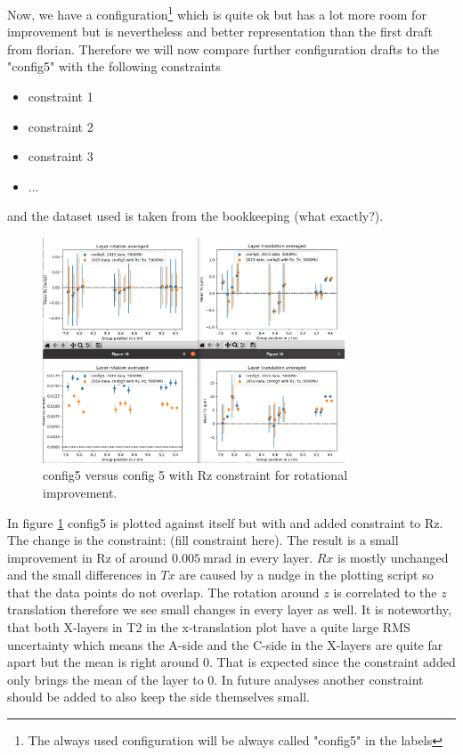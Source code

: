 
Now, we have a configuration\footnote{The always used configuration will be
always called "config5" in the labels} which is quite ok but has a lot more room for improvement but is nevertheless and better representation than the first draft from florian.
Therefore we will now compare further configuration drafts to the "config5" with the following constraints
\begin{itemize}
  \item constraint 1
  \item constraint 2
  \item constraint 3
  \item ...
\end{itemize}
and the dataset used is taken from the bookkeeping (what exactly?).

\begin{figure}
  \centering
  \includegraphics[width=0.8\textwidth]{plots/august_13/2019_c5_old_vs_withRz_MU.png}
  \caption{config5 versus config 5 with Rz constraint for rotational improvement.}
  \label{fig:withRz}
\end{figure}

In figure \ref{fig:withRz} config5 is plotted against itself but with and added constraint to Rz.
The change is the constraint: (fill constraint here).
The result is a small improvement in Rz of around $\SI{0.005}{\milli\radian}$ in every layer. $Rx$ is mostly unchanged and the small differences in $Tx$ are caused by a nudge in the plotting script so that the data points do not overlap. The rotation around $z$ is correlated to the $z$ translation therefore we see small changes in every layer as well.
It is noteworthy, that both X-layers in T2 in the x-translation plot have a quite large RMS uncertainty which means the A-side and the C-side in the X-layers are quite far apart but the mean is right around 0. That is expected since the constraint added only brings the mean of the layer to 0. In future analyses another constraint should be added to also keep the side themselves small.

